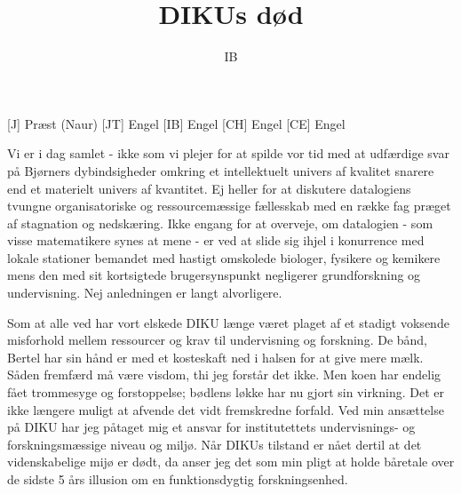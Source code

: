 \documentclass[a4paper,11pt]{article}
\title{DIKUs død}
\author{IB}
\begin{document}
\maketitle

\begin{roles}
[J] Præst (Naur)
[JT] Engel
[IB] Engel
[CH] Engel
[CE] Engel
\end{roles}

\begin{sketch}



 Vi er i dag samlet - ikke som vi plejer for at spilde vor tid med at udfærdige svar på Bjørners dybindsigheder omkring et intellektuelt univers af kvalitet snarere end et materielt univers af kvantitet.  Ej heller for at diskutere datalogiens tvungne organisatoriske og ressourcemæssige fællesskab med en række fag præget af stagnation og nedskæring.  Ikke engang for at overveje, om datalogien - som visse matematikere synes at mene - er ved at slide sig ihjel i konurrence med lokale stationer bemandet med hastigt omskolede biologer, fysikere og kemikere mens den med sit kortsigtede brugersynspunkt negligerer grundforskning og undervisning.  Nej anledningen er langt alvorligere.

 Som at alle ved har vort elskede DIKU længe været plaget af et stadigt voksende misforhold mellem ressourcer og krav til undervisning og forskning.  De bånd, Bertel har sin hånd er med et kosteskaft ned i halsen for at give mere mælk.  Såden fremfærd må være visdom, thi jeg forstår det ikke.  Men koen har endelig fået trommesyge  og forstoppelse; bødlens løkke har nu gjort sin virkning.  Det er ikke længere muligt at afvende det vidt fremskredne forfald.  Ved min ansættelse på DIKU har jeg påtaget mig et ansvar for institutettets undervisnings- og forskningsmæssige niveau og miljø.  Når DIKUs tilstand er nået dertil at det videnskabelige mijø er dødt, da anser jeg det som min pligt at holde båretale over de sidste 5 års illusion om en funktionsdygtig forskningsenhed.


\end{sketch}
\end{document}
